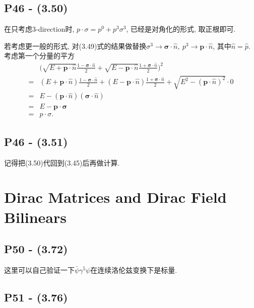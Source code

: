 \documentclass[10pt,b5paper,openany]{book}
\begin{document}
\subsection{P46 - (3.50)}

在只考虑3-direction时, $p\cdot \sigma = p^0 + p^3\sigma^3$, 已经是对角化的形式, 取正根即可. 

若考虑更一般的形式, 对(3.49)式的结果做替换$\sigma^3 \rightarrow \boldsymbol{\sigma}\cdot\hat{n},\ p^3 \rightarrow \mathbf{p}\cdot\hat{n}$, 其中$\hat{n} = \hat{p}$. 考虑第一个分量的平方
\begin{equation}
  \begin{aligned}
    &\biggl(\sqrt{E+\mathbf{p}\cdot\hat{n}} \frac{1-\boldsymbol{\sigma}\cdot\hat{n}}{2} + \sqrt{E-\mathbf{p}\cdot\hat{n}} \frac{1+\boldsymbol{\sigma}\cdot\hat{n}}{2} \biggr)^2 \\ 
    =& (E+\mathbf{p}\cdot\hat{n}) \frac{1-\boldsymbol{\sigma}\cdot\hat{n}}{2} + (E-\mathbf{p}\cdot\hat{n}) \frac{1+\boldsymbol{\sigma}\cdot\hat{n}}{2} + \sqrt{E^2 - (\mathbf{p}\cdot\hat{n})^2} \cdot 0 \\
    =& E - (\mathbf{p}\cdot\hat{n})(\boldsymbol{\sigma}\cdot\hat{n}) \\
    =& E - \mathbf{p} \cdot \boldsymbol{\sigma} \\
    =& p \cdot \sigma .
  \end{aligned}
\end{equation}

\subsection{P46 - (3.51)}

记得把(3.50)代回到(3.45)后再做计算. 

\section{Dirac Matrices and Dirac Field Bilinears}

\subsection{P50 - (3.72)}

这里可以自己验证一下$\bar{\psi} \gamma^5 \psi$在连续洛伦兹变换下是标量.

\subsection{P51 - (3.76)}
\end{document}
